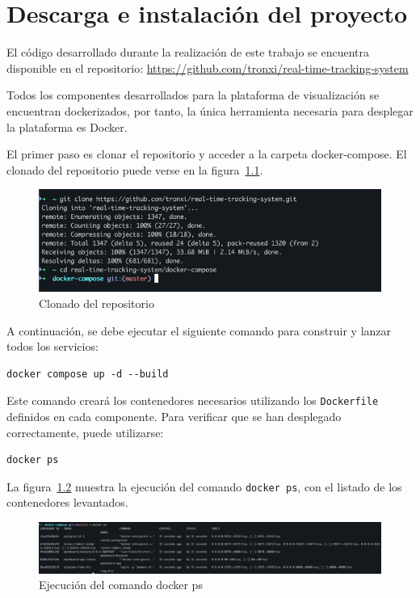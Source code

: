 \chapter{Descarga e instalación del proyecto}
\label{Appendix:Key1}

El código desarrollado durante la realización de este trabajo se encuentra disponible en el
repositorio: \url{https://github.com/tronxi/real-time-tracking-system}

Todos los componentes desarrollados para la plataforma de visualización se encuentran dockerizados, por tanto, la única herramienta necesaria para desplegar la plataforma es Docker.

El primer paso es clonar el repositorio y acceder a la carpeta docker-compose. El clonado del repositorio puede verse en la figura~\ref{fig:clone}.

\begin{figure}[H]
    \centering
    \includegraphics[width=1\textwidth]{Imagenes/Bitmap/clone}
    \caption{Clonado del repositorio}
    \label{fig:clone}
\end{figure}

A continuación, se debe ejecutar el siguiente comando para construir y lanzar todos los servicios:


\begin{verbatim}
docker compose up -d --build
\end{verbatim}

Este comando creará los contenedores necesarios utilizando los \texttt{Dockerfile} definidos en cada componente.
Para verificar que se han desplegado correctamente, puede utilizarse:

\begin{verbatim}
docker ps
\end{verbatim}
La figura~\ref{fig:ps} muestra la ejecución del comando \texttt{docker ps}, con el listado de los contenedores levantados.

\begin{figure}[H]
    \centering
    \includegraphics[width=1\textwidth]{Imagenes/Bitmap/ps}
    \caption{Ejecución del comando docker ps}
    \label{fig:ps}
\end{figure}

